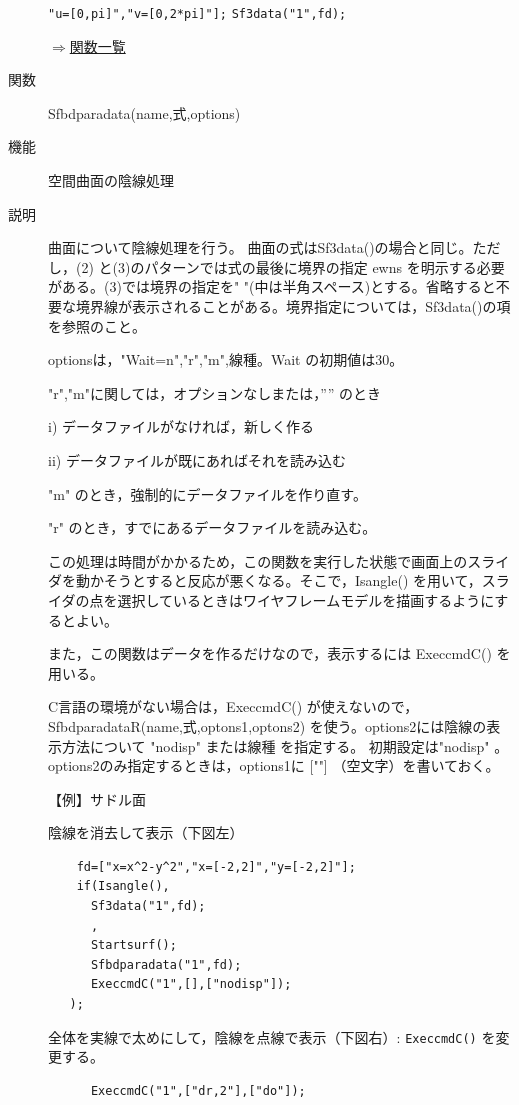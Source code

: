 \documentclass[papersize,a4paper,12pt,uplatex]{jsarticle}
\begin{document}
\begin{description}
\verb|"u=[0,pi]","v=[0,2*pi]"];|
\verb|Sf3data("1",fd);|

\begin{center}  \end{center}

\begin{flushright} \hyperlink{functionlist}{$\Rightarrow$関数一覧}\end{flushright}

\hypertarget{sfbdparadata}{}
\item[関数]  Sfbdparadata(name,式,options)
\item[機能]  空間曲面の陰線処理
\item[説明]  曲面について陰線処理を行う。
  曲面の式はSf3data()の場合と同じ。ただし，(2) と(3)のパターンでは式の最後に境界の指定 ewns を明示する必要がある。(3)では境界の指定を" "(中は半角スペース)とする。省略すると不要な境界線が表示されることがある。境界指定については，Sf3data()の項を参照のこと。
  
optionsは，"Wait=n","r","m",線種。Wait の初期値は30。

 "r","m"に関しては，オプションなしまたは，”” のとき
 
  i) データファイルがなければ，新しく作る
  
  ii) データファイルが既にあればそれを読み込む
  
"m"  のとき，強制的にデータファイルを作り直す。

"r" のとき，すでにあるデータファイルを読み込む。

この処理は時間がかかるため，この関数を実行した状態で画面上のスライダを動かそうとすると反応が悪くなる。そこで，Isangle() を用いて，スライダの点を選択しているときはワイヤフレームモデルを描画するようにするとよい。

また，この関数はデータを作るだけなので，表示するには ExeccmdC() を用いる。

C言語の環境がない場合は，ExeccmdC() が使えないので，SfbdparadataR(name,式,optons1,optons2) を使う。options2には陰線の表示方法について "nodisp" または線種 を指定する。 初期設定は"nodisp" 。options2のみ指定するときは，options1に [""] （空文字）を書いておく。

\vspace{\baselineskip}
【例】サドル面

陰線を消去して表示（下図左）
\begin{verbatim}
    fd=["x=x^2-y^2","x=[-2,2]","y=[-2,2]"];
    if(Isangle(),
      Sf3data("1",fd);
      ,
      Startsurf();
      Sfbdparadata("1",fd);
      ExeccmdC("1",[],["nodisp"]);
   );
\end{verbatim}
全体を実線で太めにして，陰線を点線で表示（下図右）: \verb|ExeccmdC()| を変更する。
\begin{verbatim}
      ExeccmdC("1",["dr,2"],["do"]);
\end{verbatim}
      \begin{center}     \end{center}


\end{description}
\end{document}
